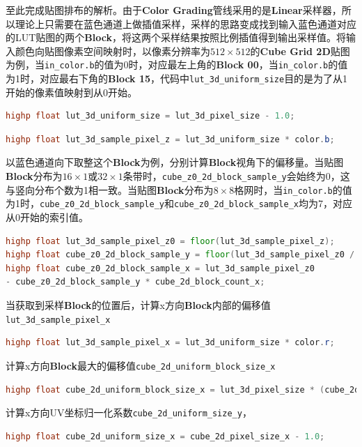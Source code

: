 \documentclass{ctexart}
\begin{document}
    至此完成贴图排布的解析。由于\textbf{Color Grading}管线采用的是\textbf{Linear}采样器，所以理论上只需要在蓝色通道上做插值采样，采样的思路变成找到输入蓝色通道对应的LUT贴图的两个\textbf{Block}，将这两个采样结果按照比例插值得到输出采样值。将输入颜色向贴图像素空间映射时，以像素分辨率为$ 512\times512 $的\textbf{Cube Grid 2D}贴图为例，当\verb|in_color.b|的值为0时，对应最左上角的\textbf{Block 00}，当\verb|in_color.b|的值为1时，对应最右下角的\textbf{Block 15}，代码中\verb|lut_3d_uniform_size|目的是为了从1开始的像素值映射到从0开始。
    \begin{lstlisting}[language=GLSL]
highp float lut_3d_uniform_size = lut_3d_pixel_size - 1.0;
    \end{lstlisting}
    \begin{lstlisting}[language=GLSL]
highp float lut_3d_sample_pixel_z = lut_3d_uniform_size * color.b;
    \end{lstlisting}
    以蓝色通道向下取整这个\textbf{Block}为例，分别计算\textbf{Block}视角下的偏移量。当贴图\textbf{Block}分布为$ 16\times1 $或$ 32\times1 $条带时，\verb|cube_z0_2d_block_sample_y|会始终为0，这与竖向分布个数为1相一致。当贴图\textbf{Block}分布为$ 8\times8 $格网时，当\verb|in_color.b|的值为1时，\verb|cube_z0_2d_block_sample_y|和\verb|cube_z0_2d_block_sample_x|均为7，对应从0开始的索引值。
    \begin{lstlisting}[language=GLSL]
highp float lut_3d_sample_pixel_z0 = floor(lut_3d_sample_pixel_z);
highp float cube_z0_2d_block_sample_y = floor(lut_3d_sample_pixel_z0 / cube_2d_block_count_x);
highp float cube_z0_2d_block_sample_x = lut_3d_sample_pixel_z0 
- cube_z0_2d_block_sample_y * cube_2d_block_count_x;
    \end{lstlisting}
    当获取到采样\textbf{Block}的位置后，计算x方向\textbf{Block}内部的偏移值\verb|lut_3d_sample_pixel_x|
    \begin{lstlisting}[language=GLSL]
highp float lut_3d_sample_pixel_x = lut_3d_uniform_size * color.r;
    \end{lstlisting}
    计算x方向\textbf{Block}最大的偏移值\verb|cube_2d_uniform_block_size_x|
    \begin{lstlisting}[language=GLSL]
highp float cube_2d_uniform_block_size_x = lut_3d_pixel_size * (cube_2d_block_count_x - 1.0);
    \end{lstlisting}
    计算x方向UV坐标归一化系数\verb|cube_2d_uniform_size_y|，
    \begin{lstlisting}[language=GLSL]
highp float cube_2d_uniform_size_x = cube_2d_pixel_size_x - 1.0;
    \end{lstlisting}
\end{document}

